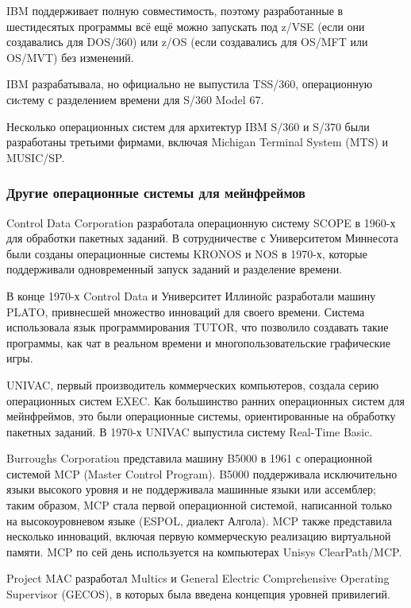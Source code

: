IBM поддерживает полную совместимость, поэтому разработанные в шестидесятых программы всё ещё можно запускать под z/VSE (если они создавались для DOS/360) или z/OS (если создавались для OS/MFT или OS/MVT) без изменений.

IBM разрабатывала, но официально не выпустила TSS/360, операционную сиcтему с разделением времени для S/360 Model 67.

Несколько операционных систем для архитектур IBM S/360 и S/370 были разработаны третьими фирмами, включая Michigan Terminal System (MTS) и MUSIC/SP.

\subsubsection{Другие операционные системы для мейнфреймов}\label{base:os:history:other}
Control Data Corporation разработала операционную систему SCO\-PE в 1960-х для обработки пакетных заданий. В сотрудничестве с Университетом Миннесота были созданы операционные системы KRONOS и NOS в 1970-х, которые поддерживали одновременный запуск заданий и разделение времени.

В конце 1970-х Control Data и Университет Иллинойс разработали машину PLATO, привнесшей множество инноваций для своего времени. Система использовала язык программирования TUTOR, что позволило создавать такие программы, как чат в реальном времени и многопользовательские графические игры.

UNIVAC, первый производитель коммерческих компьютеров, создала серию операционных систем EXEC. Как большинство ранних операционных систем для мейнфреймов, это были операционные системы, ориентированные на обработку пакетных заданий. В 1970-х UNIVAC выпустила систему Real-Time Basic.

Burroughs Corporation представила машину B5000 в 1961 с операционной системой MCP (Master Control Program). B5000 поддерживала исключительно языки высокого уровня и не поддерживала машинные языки или ассемблер; таким образом, MCP стала первой операционной системой, написанной только на высокоуровневом языке (ESPOL, диалект Алгола). MCP также представила несколько инноваций, включая первую коммерческую реализацию виртуальной памяти. MCP по сей день используется на компьютерах Unisys ClearPath/MCP.

Project MAC разработал Multics и  General Electric Comprehensive Operating Supervisor (GECOS),  в которых была введена концепция уровней привилегий.

